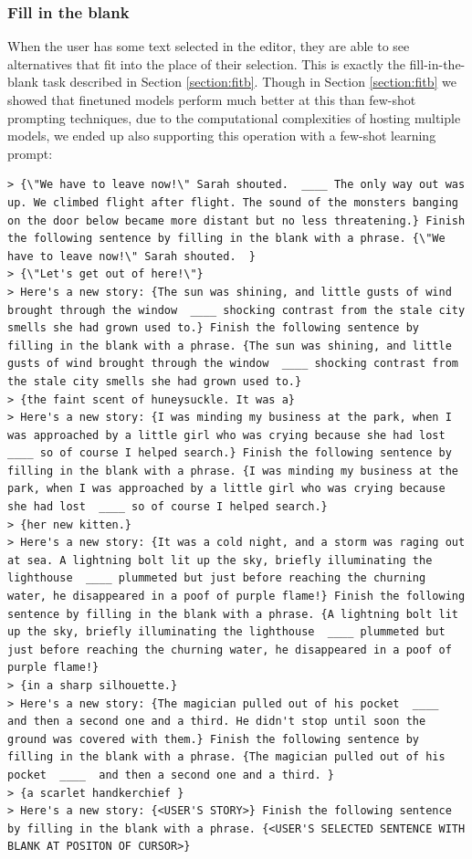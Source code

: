 \subsubsection{Fill in the blank}
When the user has some text selected in the editor, they are able to see alternatives that fit into the place of their selection.
This is exactly the fill-in-the-blank task described in Section \ref{section:fitb}.
Though in Section \ref{section:fitb} we showed that finetuned models perform much better at this than few-shot prompting techniques, due to the computational complexities of hosting multiple models, we ended up also supporting this operation with a few-shot learning prompt:

\begin{lstlisting}
> {\"We have to leave now!\" Sarah shouted.  ____ The only way out was up. We climbed flight after flight. The sound of the monsters banging on the door below became more distant but no less threatening.} Finish the following sentence by filling in the blank with a phrase. {\"We have to leave now!\" Sarah shouted.  }
> {\"Let's get out of here!\"}
> Here's a new story: {The sun was shining, and little gusts of wind brought through the window  ____ shocking contrast from the stale city smells she had grown used to.} Finish the following sentence by filling in the blank with a phrase. {The sun was shining, and little gusts of wind brought through the window  ____ shocking contrast from the stale city smells she had grown used to.}
> {the faint scent of huneysuckle. It was a}
> Here's a new story: {I was minding my business at the park, when I was approached by a little girl who was crying because she had lost  ____ so of course I helped search.} Finish the following sentence by filling in the blank with a phrase. {I was minding my business at the park, when I was approached by a little girl who was crying because she had lost  ____ so of course I helped search.}
> {her new kitten.}
> Here's a new story: {It was a cold night, and a storm was raging out at sea. A lightning bolt lit up the sky, briefly illuminating the lighthouse  ____ plummeted but just before reaching the churning water, he disappeared in a poof of purple flame!} Finish the following sentence by filling in the blank with a phrase. {A lightning bolt lit up the sky, briefly illuminating the lighthouse  ____ plummeted but just before reaching the churning water, he disappeared in a poof of purple flame!}
> {in a sharp silhouette.}
> Here's a new story: {The magician pulled out of his pocket  ____  and then a second one and a third. He didn't stop until soon the ground was covered with them.} Finish the following sentence by filling in the blank with a phrase. {The magician pulled out of his pocket  ____  and then a second one and a third. }
> {a scarlet handkerchief }
> Here's a new story: {<USER'S STORY>} Finish the following sentence by filling in the blank with a phrase. {<USER'S SELECTED SENTENCE WITH BLANK AT POSITON OF CURSOR>}
\end{lstlisting}

